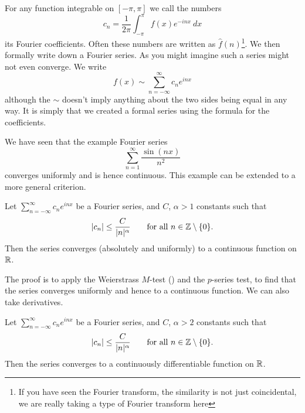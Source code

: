 For any function integrable on $[-\pi,\pi]$ we call the numbers
\begin{equation*}
c_n = 
\frac{1}{2\pi} \int_{-\pi}^\pi
f(x) e^{-inx} ~ dx
\end{equation*}
its Fourier coefficients.  Often these numbers are
written as $\hat{f}(n)$\footnote{If you have seen the Fourier transform,
the similarity is not just
coincidental, we are really taking a type of Fourier transform here}.
We then formally write down a Fourier series.
As you might imagine such a series might not even converge.
We write
\begin{equation*}
f(x) \sim
\sum_{n=-\infty}^\infty c_n e^{inx}
\end{equation*}
although the $\sim$ doesn't imply anything about the two sides being equal
in any way.  It is simply that we created a formal series using the formula
for the coefficients.

We have seen that the example Fourier series 
\begin{equation*}
\sum_{n=1}^\infty \frac{\sin(nx)}{n^2}
\end{equation*}
converges uniformly and is hence continuous.  This 
example can be extended to a more general criterion.

\begin{prop}
Let $\sum_{n=-\infty}^\infty c_n e^{inx}$ be a Fourier series,
and $C$, $\alpha > 1$ constants such that
\begin{equation*}
\lvert {c_n} \rvert \leq \frac{C}{\lvert {n} \rvert^\alpha}
\qquad \text{for all $n \in {\mathbb{Z}} \setminus \{ 0 \}$}.
\end{equation*}
Then the series converges (absolutely and uniformly) to a continuous function on ${\mathbb{R}}$.
\end{prop}

The proof is to apply the Weierstrass $M$-test () and
the $p$-series test, to find that the series converges uniformly and hence
to a continuous function.
We can also take derivatives.

\begin{prop}
Let $\sum_{n=-\infty}^\infty c_n e^{inx}$ be a Fourier series,
and $C$, $\alpha > 2$ constants such that
\begin{equation*}
\lvert {c_n} \rvert \leq \frac{C}{\lvert {n} \rvert^\alpha}
\qquad \text{for all $n \in {\mathbb{Z}} \setminus \{ 0 \}$}.
\end{equation*}
Then the series converges to a continuously differentiable function on ${\mathbb{R}}$.
\end{prop}

